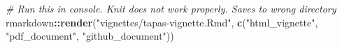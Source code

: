 \documentclass[]{article}
\newenvironment{Shaded}{\begin{snugshade}}{\end{snugshade}}
\newcommand{\CommentTok}[1]{\textcolor[rgb]{0.56,0.35,0.01}{\textit{#1}}}
\newcommand{\KeywordTok}[1]{\textcolor[rgb]{0.13,0.29,0.53}{\textbf{#1}}}
\newcommand{\NormalTok}[1]{#1}
\newcommand{\OperatorTok}[1]{\textcolor[rgb]{0.81,0.36,0.00}{\textbf{#1}}}
\newcommand{\StringTok}[1]{\textcolor[rgb]{0.31,0.60,0.02}{#1}}
\begin{document}
\begin{Shaded}
\begin{Highlighting}[]
\CommentTok{# Run this in console. Knit does not work properly. Saves to wrong directory}
\NormalTok{rmarkdown}\OperatorTok{::}\KeywordTok{render}\NormalTok{(}\StringTok{"vignettes/tapas-vignette.Rmd"}\NormalTok{,}
                  \KeywordTok{c}\NormalTok{(}\StringTok{"html_vignette"}\NormalTok{, }
                    \StringTok{"pdf_document"}\NormalTok{, }
                    \StringTok{"github_document"}\NormalTok{))}
\end{Highlighting}
\end{Shaded}
\end{document}
